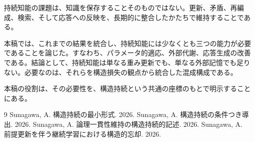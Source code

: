 \documentclass[12pt,a4paper]{article}
\begin{document}
持続知能の課題は、知識を保存することそのものではない。更新、矛盾、再編成、検索、そして応答への反映を、長期的に整合したかたちで維持することである。

本稿では、これまでの結果を統合し、持続知能には少なくとも三つの能力が必要であることを論じた。すなわち、パラメータ的適応、外部代謝、応答生成の改善である。結論として、持続知能は単なる重み更新でも、単なる外部記憶でも足りない。必要なのは、それらを構造損失の観点から統合した混成構成である。

本稿の役割は、その必要性を、構造持続という共通の座標のもとで明示することにある。

\begin{thebibliography}{9}
 Sunagawa, A. 構造持続の最小形式. 2026.
 Sunagawa, A. 構造持続の条件つき導出. 2026.
 Sunagawa, A. 論理一貫性維持の構造持続的記述. 2026.
 Sunagawa, A. 前提更新を伴う継続学習における構造的忘却. 2026.
\end{thebibliography}
\end{document}
